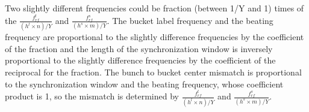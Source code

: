 Two slightly different frequencies could be fraction (between 1/Y and 1) times of the $\frac{f_{rf}^{l}}{(h^l\times n)/Y}$ and $\frac{f_{rf}^{s}}{(h^s\times m)/Y}$. The bucket label frequency and the beating frequency are proportional to the slightly difference frequencies by the coefficient of the fraction and the length of the synchronization window is inversely proportional to the slightly difference frequencies by the coefficient of the reciprocal for the fraction. The bunch to bucket center mismatch is proportional to the synchronization window and the beating frequency, whose coefficient product is 1, so the mismatch is determined by $\frac{f_{rf}^{l}}{(h^l\times n)/Y}$ and $\frac{f_{rf}^{s}}{(h^s\times m)/Y}$.


%
%
